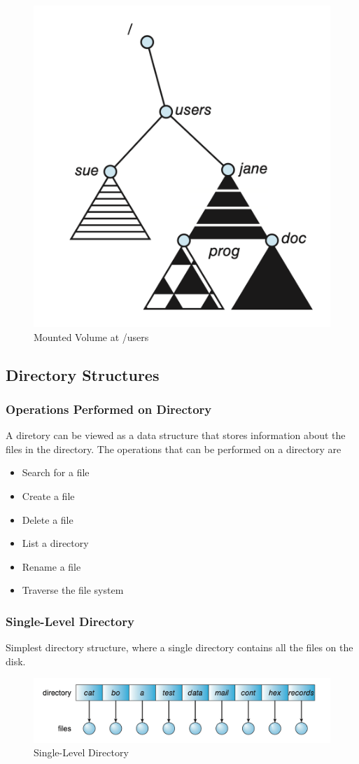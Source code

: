 \documentclass[oneside]{book}
\begin{document}
                        \begin{figure}[H]
                            \centering
                            \includegraphics[width=0.3\linewidth]{figures/mounted_volume.png}
                            \caption{Mounted Volume at /users}
                        \end{figure}
                \subsection{Directory Structures}
                    \subsubsection{Operations Performed on Directory}
                            A diretory can be viewed as a data structure that stores information about the files in the directory.
                            The operations that can be performed on a directory are
                            \begin{itemize}
                                \item Search for a file
                                \item Create a file
                                \item Delete a file
                                \item List a directory
                                \item Rename a file
                                \item Traverse the file system
                            \end{itemize}
                    \subsubsection{Single-Level Directory}
                        Simplest directory structure, where a single directory contains all the files on the disk.\\
                        \begin{figure}[H]
                            \centering
                            \includegraphics[width=0.6\linewidth]{figures/single_level_dir.png}
                            \caption{Single-Level Directory}
                        \end{figure}
\end{document}
